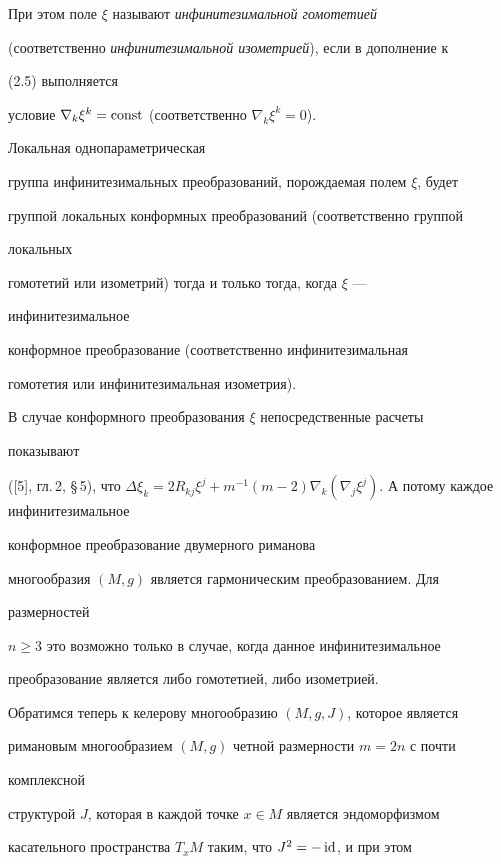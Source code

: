 При этом поле $\xi$ называют {\it инфинитезимальной гомотетией} 


(соответственно {\it инфинитезимальной изометрией}), если в дополнение к 


(2.5) выполняется 


условие $\nabla_k\xi^k=\operatorname{const}$ (соответственно $\nabla_k\xi^k=0$). 


Локальная однопараметрическая 


группа инфинитезимальных преобразований, порождаемая полем $\xi$, будет 


группой локальных конформных преобразований (соответственно группой 


локальных 


гомотетий или изометрий) тогда и только тогда, когда $\xi$ --- 


инфинитезимальное 


конформное преобразование (соответственно инфинитезимальная 


гомотетия или инфинитезимальная изометрия). 


 


В случае конформного преобразования $\xi$ непосредственные расчеты 


показывают 


([5], гл.\,2, \S\,5), что $\Delta\xi_k= 2R_{kj}\xi^j+ m^{-1}(m-2)\nabla_k 


(\nabla_j\xi^j)$. А потому каждое инфинитезимальное 


конформное преобразование двумерного риманова 


многообразия $(M,g)$ является гармоническим преобразованием. Для 


размерностей 


$n\ge3$ это возможно только в случае, когда данное инфинитезимальное 


преобразование является либо гомотетией, либо изометрией. 


 


Обратимся теперь к келерову многообразию $(M,g,J)$, которое является 


римановым многообразием $(M,g)$ четной размерности $m=2n$ с почти 


комплексной 


структурой $J$, которая в каждой точке $x\in M$ является эндоморфизмом 


касательного пространства $T_xM$ таким, что $J^2=-\operatorname{id}$, и при этом 


